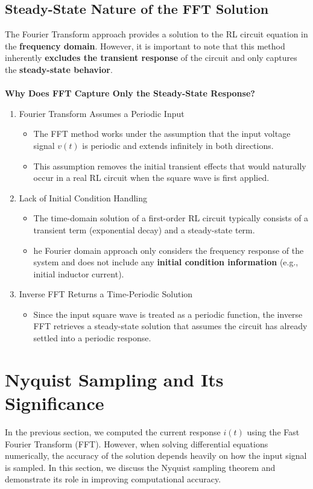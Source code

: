 \documentclass[journal]{IEEEtran}
\begin{document}
\subsection{Steady-State Nature of the FFT Solution}
The Fourier Transform approach provides a solution to the RL circuit equation in the \textbf{frequency domain}. However, it is important to note that this method inherently \textbf{excludes the transient response} of the circuit and only captures the \textbf{steady-state behavior}. \\ \\ 
\textbf{Why Does FFT Capture Only the Steady-State Response?}
\begin{enumerate}
    \item Fourier Transform Assumes a Periodic Input
    \begin{itemize}
        \item The FFT method works under the assumption that the input voltage signal $v(t)$ is periodic and extends infinitely in both directions.
        \item This assumption removes the initial transient effects that would naturally occur in a real RL circuit when the square wave is first applied.
    \end{itemize}
    \item Lack of Initial Condition Handling
    \begin{itemize}
        \item The time-domain solution of a first-order RL circuit typically consists of a transient term (exponential decay) and a steady-state term.
        \item he Fourier domain approach only considers the frequency response of the system and does not include any \textbf{initial condition information} (e.g., initial inductor current).
    \end{itemize}
    \item Inverse FFT Returns a Time-Periodic Solution
    \begin{itemize}
        \item Since the input square wave is treated as a periodic function, the inverse FFT retrieves a steady-state solution that assumes the circuit has already settled into a periodic response.

    \end{itemize}
\end{enumerate}

\section{ Nyquist Sampling and Its Significance}
In the previous section, we computed the current response $i(t)$ using the Fast Fourier Transform (FFT). However, when solving differential equations numerically, the accuracy of the solution depends heavily on how the input signal is sampled. In this section, we discuss the Nyquist sampling theorem and demonstrate its role in improving computational accuracy.
\end{document}
